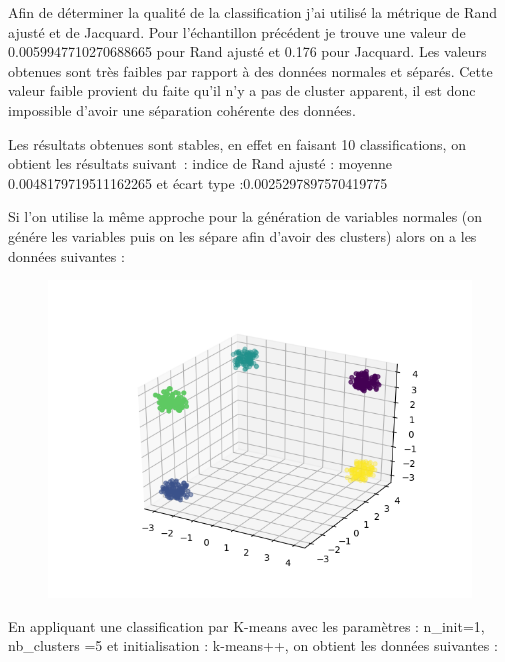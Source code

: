 \documentclass[12pt]{scrartcl} %
\begin{document}
\newline
Afin de déterminer la qualité de la classification j'ai utilisé la métrique de Rand ajusté et de Jacquard. Pour l'échantillon précédent je trouve une valeur de 0.0059947710270688665 pour Rand ajusté et 0.176 pour Jacquard. Les valeurs obtenues sont très faibles par rapport à des données normales et séparés. Cette valeur faible provient du faite qu'il n'y a pas de cluster apparent, il est donc impossible d'avoir une séparation cohérente des données. 

Les résultats obtenues sont stables, en effet en faisant 10 classifications, on obtient les résultats suivant~: indice de Rand ajusté : moyenne 0.0048179719511162265 et écart type :0.0025297897570419775

Si l'on utilise la même approche pour la génération de variables normales (on génére les variables puis on les sépare afin d'avoir des clusters) alors on a les données suivantes :
\newline
\begin{figure}[!h]
 \centering 
\includegraphics[scale=.3]{unifor_lag.png}
\end{figure}
\newline
En appliquant une classification par K-means avec les paramètres : n\_init=1, nb\_clusters =5 et initialisation : k-means++, on obtient les données suivantes : 
\newline
\end{document}

